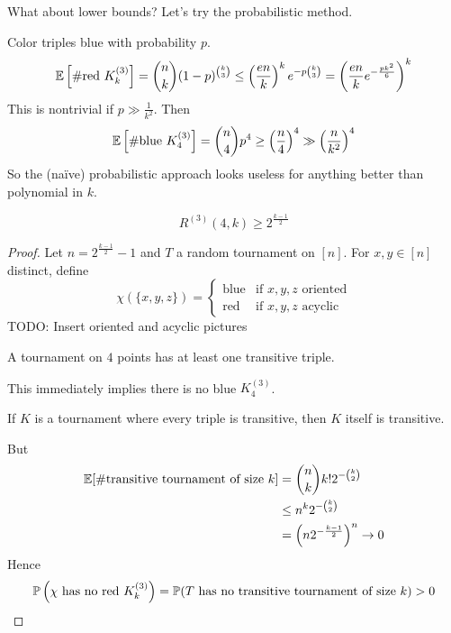\documentclass{article}
\begin{document}
\newlec

What about lower bounds? Let's try the probabilistic method.

Color triples blue with probability $p$.
$$\E\left[\#\text{red }K_k^{(3)}\right] = \binom nk (1 - p)^{\binom k3} \le \left(\frac{en}k\right)^k e^{-p\binom k3} = \left(\frac{en}k e^{-\frac{pk^2}6}\right)^k$$
This is nontrivial if $p \gg \frac 1{k^2}$. Then
$$\E\left[\#\text{blue }K_4^{(3)}\right] = \binom n4 p^4 \ge \left(\frac n4\right)^4 \gg \left(\frac n{k^2}\right)^4$$
So the (naïve) probabilistic approach looks useless for anything better than polynomial in $k$.

\begin{thm}
  $$R^{(3)}(4, k) \ge 2^{\frac{k - 1}2}$$
\end{thm}
\begin{proof}
  Let $n = 2^{\frac{k - 1}2} - 1$ and $T$ a random tournament on $[n]$. For $x, y \in [n]$ distinct, define
  $$\chi(\{x, y, z\}) =
  \begin{cases}
    \text{blue} & \text{if $x, y, z$ oriented} \\
    \text{red} & \text{if $x, y, z$ acyclic}
  \end{cases}$$
  TODO: Insert oriented and acyclic pictures
  \begin{obs}
    A tournament on $4$ points has at least one transitive triple.
  \end{obs}
  This immediately implies there is no blue $K_4^{(3)}$.
  \begin{obs}
    If $K$ is a tournament where every triple is transitive, then $K$ itself is transitive.
  \end{obs}
  But
  \begin{align*}
    \E[\#\text{transitive tournament of size } k]
    & = \binom nk k! 2^{-\binom k2} \\
    & \le n^k 2^{-\binom k2} \\
    & = \left(n2^{-\frac{k - 1}2}\right)^n \mor 0
  \end{align*}
  Hence
  $$\P\left(\chi \text{ has no red } K_k^{(3)}\right) = \P(T \text{ has no transitive tournament of size } k) > 0$$
\end{proof}
\end{document}
